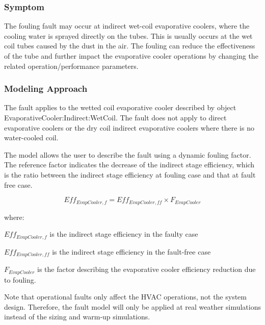 \subsubsection{Symptom}

The fouling fault may occur at indirect wet-coil evaporative coolers, where the cooling water is sprayed directly on the tubes. This is usually occurs at the wet coil tubes caused by the dust in the air. The fouling can reduce the effectiveness of the tube and further impact the evaporative cooler operations by changing the related operation/performance parameters.

\subsubsection{Modeling Approach}

The fault applies to the wetted coil evaporative cooler described by object EvaporativeCooler:Indirect:WetCoil. The fault does not apply to direct evaporative coolers or the dry coil indirect evaporative coolers where there is no water-cooled coil.

The model allows the user to describe the fault using a dynamic fouling factor. The reference factor indicates the decrease of the indirect stage efficiency, which is the ratio between the indirect stage efficiency at fouling case and that at fault free case.

\begin{equation}
Eff_{EvapCooler,f} = Eff_{EvapCooler,ff} \times F_{EvapCooler}
\end{equation}

where:

\(Eff_{EvapCooler,f}\) is the indirect stage efficiency in the faulty case

\(Eff_{EvapCooler,ff}\) is the indirect stage efficiency in the fault-free case

\(F_{EvapCooler}\) is the factor describing the evaporative cooler efficiency reduction due to fouling.

Note that operational faults only affect the HVAC operations, not the system design. Therefore, the fault model will only be applied at real weather simulations instead of the sizing and warm-up simulations.

